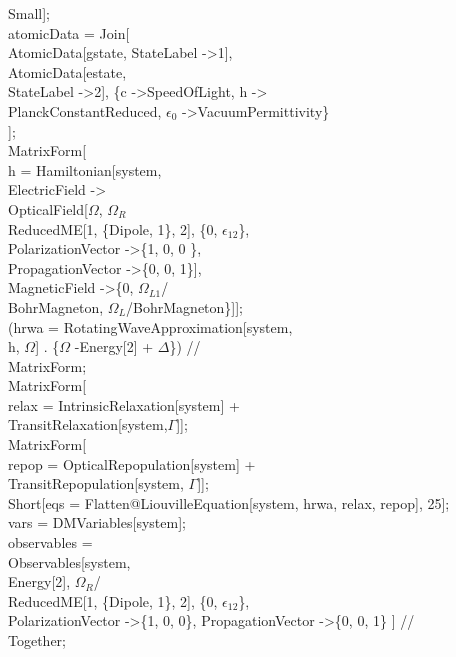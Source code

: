   Small];\\
atomicData = Join[\\
   AtomicData[gstate, StateLabel -\textgreater 1],\\
   AtomicData[estate, \\
    StateLabel -\textgreater 2], \{c -\textgreater SpeedOfLight, h -\textgreater \\
     PlanckConstantReduced, $\epsilon_0$ -\textgreater VacuumPermittivity\}\\
   ];\\
MatrixForm[\\
  h = Hamiltonian[system, \\
    ElectricField -\textgreater \\
     OpticalField[$\Omega$, $\Omega_R$ \\
       ReducedME[1, \{Dipole, 1\}, 2], \{0, $\epsilon_{12}$\}, \\
      PolarizationVector -\textgreater \{1, 0, 0 \}, \\
      PropagationVector -\textgreater \{0, 0, 1\}], \\
    MagneticField -\textgreater \{0, $\Omega_{L1}$/ \\
       BohrMagneton, $\Omega_L$/BohrMagneton\}]]; \\
(hrwa = RotatingWaveApproximation[system, \\
      h, $\Omega$] . \{$\Omega$ -\rbrack Energy[2] + $\Delta$\}) // \\
  MatrixForm; \\
MatrixForm[ \\
  relax = IntrinsicRelaxation[system] + \\
    TransitRelaxation[system,$\Gamma$]];\\
MatrixForm[\\
  repop = OpticalRepopulation[system] + \\
    TransitRepopulation[system, $\Gamma$]];\\
Short[eqs = Flatten@LiouvilleEquation[system, hrwa, relax, repop], 25];\\
vars = DMVariables[system];\\
observables = \\
  Observables[system, \\
    Energy[2], $\Omega_R$/ \\
     ReducedME[1, \{Dipole, 1\}, 2], \{0, $\epsilon_{12}$\}, \\
    PolarizationVector -\textgreater \{1, 0, 0\}, PropagationVector -\textgreater \{0, 0, 1\} ] // \\
    Together;\\

